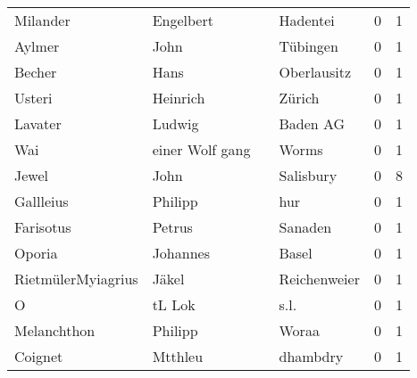 \begin{tabular}{llllrr}
                 Milander &                          Engelbert &             &                                    Hadentei &          0 &         1 \\
                   Aylmer &                               John &             &                                    Tübingen &          0 &         1 \\
                   Becher &                               Hans &             &                                 Oberlausitz &          0 &         1 \\
                   Usteri &                           Heinrich &             &                                      Zürich &          0 &         1 \\
                  Lavater &                             Ludwig &             &                                    Baden AG &          0 &         1 \\
                      Wai &                    einer Wolf gang &             &                                       Worms &          0 &         1 \\
                    Jewel &                               John &             &                                   Salisbury &          0 &         8 \\
                Gallleius &                            Philipp &             &                                         hur &          0 &         1 \\
                Farisotus &                             Petrus &             &                                     Sanaden &          0 &         1 \\
                   Oporia &                           Johannes &             &                                       Basel &          0 &         1 \\
       RietmülerMyiagrius &                              Jäkel &             &                                Reichenweier &          0 &         1 \\
                        O &                             tL Lok &             &                                        s.l. &          0 &         1 \\
              Melanchthon &                            Philipp &             &                                       Woraa &          0 &         1 \\
                  Coignet &                            Mtthleu &             &                                    dhambdry &          0 &         1 \\

\end{tabular}

